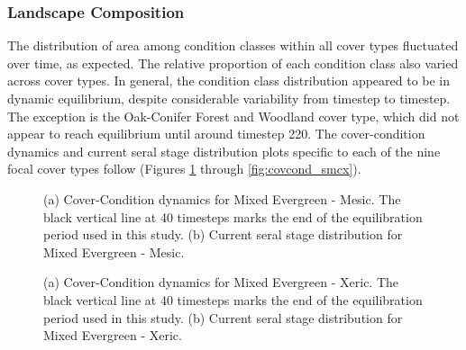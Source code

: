 \subsubsection{Landscape Composition} 

The distribution of area among condition classes within all cover types fluctuated over time, as expected. The relative proportion of each condition class also varied across cover types. In general, the condition class distribution appeared to be in dynamic equilibrium, despite considerable variability from timestep to timestep. The exception is the Oak-Conifer Forest and Woodland cover type, which did not appear to reach equilibrium until around timestep 220. The cover-condition dynamics and current seral stage distribution plots specific to each of the nine focal cover types follow (Figures \ref{fig:covcond_megm} through \ref{fig:covcond_smcx}).



\begin{figure}[!htbp]
  \centering
  \caption{(a) Cover-Condition dynamics for Mixed Evergreen - Mesic. The black vertical line at 40 timesteps marks the end of the equilibration period used in this study. (b) Current seral stage distribution for Mixed Evergreen - Mesic.}
\label{fig:covcond_megm}
\end{figure}


\begin{figure}[!htbp]
  \centering
  \caption{(a) Cover-Condition dynamics for Mixed Evergreen - Xeric. The black vertical line at 40 timesteps marks the end of the equilibration period used in this study. (b) Current seral stage distribution for Mixed Evergreen - Xeric.} 
  \label{fig:covcond_megx}
\end{figure}

